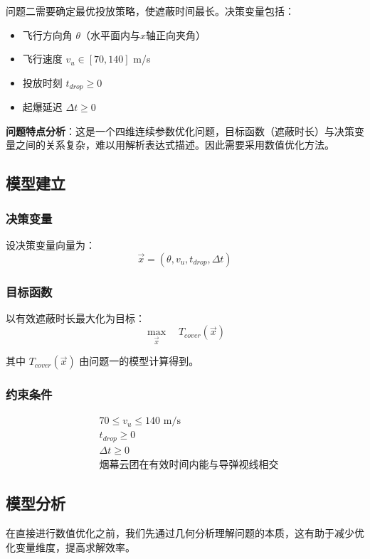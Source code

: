 \documentclass[12pt,a4paper]{article}
\begin{document}
问题二需要确定最优投放策略，使遮蔽时间最长。决策变量包括：
\begin{itemize}
    \item 飞行方向角 $\theta$（水平面内与$x$轴正向夹角）
    \item 飞行速度 $v_u \in [70, 140]$ m/s
    \item 投放时刻 $t_{drop} \geq 0$
    \item 起爆延迟 $\Delta t \geq 0$
\end{itemize}

\textbf{问题特点分析}：这是一个四维连续参数优化问题，目标函数（遮蔽时长）与决策变量之间的关系复杂，难以用解析表达式描述。因此需要采用数值优化方法。

\subsection{模型建立}

\subsubsection{决策变量}

设决策变量向量为：
$$\vec{x} = (\theta, v_u, t_{drop}, \Delta t)$$

\subsubsection{目标函数}

以有效遮蔽时长最大化为目标：
$$\max_{\vec{x}} \quad T_{cover}(\vec{x})$$

其中 $T_{cover}(\vec{x})$ 由问题一的模型计算得到。

\subsubsection{约束条件}

\begin{align}
& 70 \leq v_u \leq 140 \text{ m/s} \\
& t_{drop} \geq 0 \\
& \Delta t \geq 0 \\
& \text{烟幕云团在有效时间内能与导弹视线相交}
\end{align}

\subsection{模型分析}

在直接进行数值优化之前，我们先通过几何分析理解问题的本质，这有助于减少优化变量维度，提高求解效率。
\end{document}
